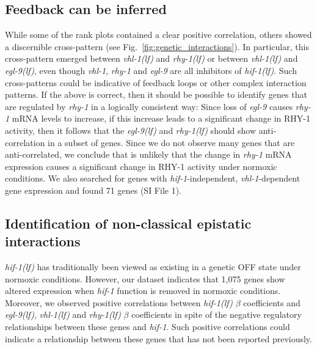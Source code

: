 \documentclass[9pt,twocolumn,twoside]{pnas-new}
\newcommand{\gene}[1]{\mbox{\emph{#1}}}
\newcommand{\egl}{\gene{egl-9(lf)}}
\newcommand{\rhy}{\gene{rhy-1(lf)}}
\newcommand{\vhl}{\gene{vhl-1(lf)}}
\newcommand{\hif}{\gene{hif-1(lf)}}
\newcommand{\hifn}{1,075}
\newcommand{\vhltargets}{71} %
\begin{document}
\subsection*{Feedback can be inferred}
\label{sub:topology}
While some of the rank plots contained a clear positive correlation, others
showed a discernible cross-pattern (see Fig.~\ref{fig:genetic_interactions}). In
particular, this cross-pattern emerged between \vhl{} and \rhy{} or between
\vhl{} and \egl{}, even though \gene{vhl-1}, \gene{rhy-1} and \gene{egl-9} are
all inhibitors of \hif{}. Such cross-patterns could be indicative of feedback
loops or other complex interaction patterns. If the above is correct, then it
should be possible to identify genes that are regulated by \gene{rhy-1} in a
logically consistent way: Since loss of \gene{egl-9} causes \gene{rhy-1} mRNA
levels to increase, if this increase leads to a significant change in RHY-1
activity, then it follows that the \egl{} and \rhy{} should show
anti-correlation in a subset of genes. Since we do not observe many genes that
are anti-correlated, we conclude that is unlikely that the change in
\gene{rhy-1} mRNA expression causes a significant change in RHY-1 activity under
normoxic conditions. We also searched for genes with \gene{hif-1}-independent,
\gene{vhl-1}-dependent gene expression and found \vhltargets{} genes (SI File
1).

\subsection*{Identification of non-classical epistatic interactions}
\label{sub:hifoh}
\hif{} has traditionally been viewed as existing in a genetic OFF state under
normoxic conditions. However, our dataset indicates that \hifn{} genes show
altered expression when \gene{hif-1} function is removed in normoxic conditions.
Moreover, we observed positive correlations between \hif{} $\beta$ coefficients
and \egl{}, \vhl{} and \rhy{} $\beta$ coefficients in spite of the negative
regulatory relationships between these genes and \gene{hif-1}. Such positive
correlations could indicate a relationship between these genes that has not
been reported previously.
\end{document}
